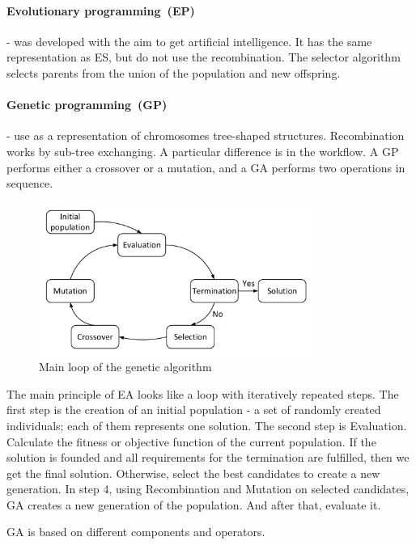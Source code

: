 \paragraph{Evolutionary programming~(EP)} - was developed with the aim to get artificial intelligence\cite{eiben03}. It has the same representation as ES, but do not use the recombination. The selector algorithm selects parents from the union of the population and new offspring.
\paragraph{Genetic programming~(GP)} - use as a representation of chromosomes tree-shaped structures. Recombination works by sub-tree exchanging. A particular difference is in the workflow. A GP performs either a crossover or a mutation, and a GA performs two operations in sequence.

\begin{figure}
	\centering
	\includegraphics[width=0.8\textwidth]{images/GeneticLoop.pdf}
	\caption[Main loop of the genetic algorithm]{Main loop of the genetic algorithm}
	\label{fig:GeneticLoop}
\end{figure}

The main principle of EA looks like a loop with iteratively repeated steps.
The first step is the creation of an initial population - a set of randomly created individuals; each of them represents one solution. 
The second step is Evaluation. Calculate the fitness or objective function of the current population.
If the solution is founded and all requirements for the termination are fulfilled, then we get the final solution. Otherwise, select the best candidates to create a new generation.
In step 4, using Recombination and Mutation on selected candidates, GA creates a new generation of the population. And after that, evaluate it.

GA is based on different components and operators.

